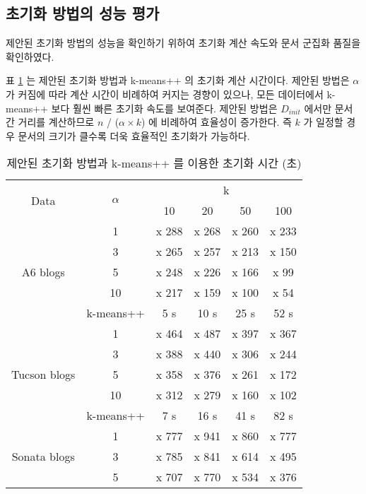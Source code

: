 \documentclass[oneside, ko,phd]{snuthesis_utf8_kor}
\begin{document}
\subsection{초기화 방법의 성능 평가}

제안된 초기화 방법의 성능을 확인하기 위하여 초기화 계산 속도와 문서 군집화 품질을 확인하였다.

표 \ref{tab:performance_initialization_time} 는 제안된 초기화 방법과 k-means++ 의 초기화 계산 시간이다.
제안된 방법은 $\alpha$ 가 커짐에 따라 계산 시간이 비례하여 커지는 경향이 있으나, 모든 데이터에서 k-means++ 보다 훨씬 빠른 초기화 속도를 보여준다.
제안된 방법은 $D_{init}$ 에서만 문서 간 거리를 계산하므로 $n$ / ($\alpha \times k$) 에 비례하여 효율성이 증가한다.
즉 $k$ 가 일정할 경우 문서의 크기가 클수록 더욱 효율적인 초기화가 가능하다.

\begin{table}[H]
\small
\centering
\caption{제안된 초기화 방법과 k-means++ 를 이용한 초기화 시간 (초)}
\label{tab:performance_initialization_time}
\renewcommand{\arraystretch}{.67}
\begin{tabular}{|c|c|c|c|c|c|}
\hline
\multirow{2}{*}{Data} & \multirow{2}{*}{$\alpha$} & \multicolumn{4}{c|}{k} \\ \cline{3-6} 
 &  & 10 & 20 & 50 & 100 \\ \hline
\multirow{5}{*}{A6 blogs} & 1 & x 288 & x 268 & x 260 & x 233 \\ \cline{2-6} 
 & 3 & x 265 & x 257 & x 213 & x 150 \\ \cline{2-6} 
 & 5 & x 248 & x 226 & x 166 & x 99 \\ \cline{2-6} 
 & 10 & x 217 & x 159 & x 100 & x 54 \\ \cline{2-6} 
 & k-means++ & 5 s & 10 s & 25 s & 52 s \\ \hline
\multirow{5}{*}{Tucson blogs} & 1 & x 464 & x 487 & x 397 & x 367 \\ \cline{2-6} 
 & 3 & x 388 & x 440 & x 306 & x 244 \\ \cline{2-6} 
 & 5 & x 358 & x 376 & x 261 & x 172 \\ \cline{2-6} 
 & 10 & x 312 & x 279 & x 160 & x 102 \\ \cline{2-6} 
 & k-means++ & 7 s & 16 s & 41 s & 82 s \\ \hline
\multirow{5}{*}{Sonata blogs} & 1 & x 777 & x 941 & x 860 & x 777 \\ \cline{2-6} 
 & 3 & x 785 & x 841 & x 614 & x 495 \\ \cline{2-6} 
 & 5 & x 707 & x 770 & x 534 & x 376 \\ \cline{2-6} 

\end{tabular}
\end{table}
\end{document}
